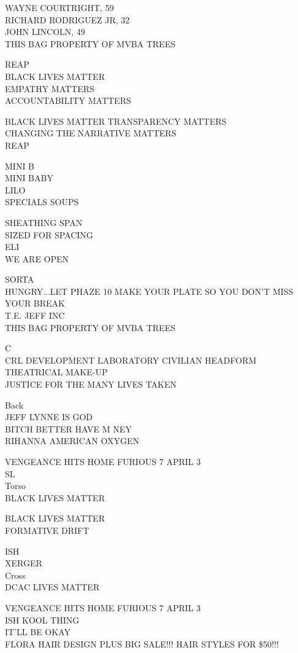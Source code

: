 \documentclass[10pt,letterpaper]{article}
\begin{document}
WAYNE COURTRIGHT, 59\\
RICHARD RODRIGUEZ JR, 32\\
JOHN LINCOLN, 49\\
THIS BAG PROPERTY OF MVBA TREES

REAP\\
BLACK LIVES MATTER\\
EMPATHY MATTERS\\
ACCOUNTABILITY MATTERS

BLACK LIVES MATTER TRANSPARENCY MATTERS\\
CHANGING THE NARRATIVE MATTERS\\
REAP

MINI B\\
MINI BABY\\
LILO\\
SPECIALS SOUPS

SHEATHING SPAN\\
SIZED FOR SPACING\\
ELI\\
WE ARE OPEN

SORTA\\
HUNGRY...LET PHAZE 10 MAKE YOUR PLATE SO YOU DON'T MISS YOUR BREAK\\
T.E. JEFF INC\\
THIS BAG PROPERTY OF MVBA TREES

C\\
CRL DEVELOPMENT LABORATORY CIVILIAN HEADFORM\\
THEATRICAL MAKE{-}UP\\
JUSTICE FOR THE MANY LIVES TAKEN

Back\\
JEFF LYNNE IS GOD\\
BITCH BETTER HAVE M NEY\\
RIHANNA AMERICAN OXYGEN

VENGEANCE HITS HOME FURIOUS 7 APRIL 3\\
SL\\
Torso\\
BLACK LIVES MATTER

BLACK LIVES MATTER\\
FORMATIVE DRIFT

ISH\\
XERGER\\
Cross\\
DCAC LIVES MATTER

VENGEANCE HITS HOME FURIOUS 7 APRIL 3\\
ISH KOOL THING\\
IT'LL BE OKAY\\
FLORA HAIR DESIGN PLUS BIG SALE!!!  HAIR STYLES FOR \$50!!!
\end{document}
